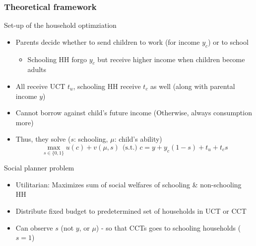 \documentclass[aspectratio=169]{beamer}
\begin{document}
\begin{frame}
\frametitle{Theoretical framework}
Set-up of the household optimziation
\begin{itemize}\setlength\itemsep{3pt}
\item Parents decide whether to send children to work (for income $y_c$) or to school
\begin{itemize}
\item Schooling HH forgo $y_c$ but receive higher income when children become adults
\end{itemize}
\item All receive UCT $t_u$, schooling HH receive $t_c$ as well (along with parental income $y$)
\item Cannot borrow against child's future income (Otherwise, always consumption more)
\item Thus, they solve ($s$: schooling, $\mu$: child's ability)
\[
\max_{s\in\{0,1\}} u(c) + v(\mu, s) \ \ \text{(s.t.) } c = y + y_c(1-s)+t_u + t_c s
\]
\end{itemize}\medskip
Social planner problem
\begin{itemize}\setlength\itemsep{3pt}
\item Utilitarian: Maximizes sum of social welfares of schooling \& non-schooling HH
\item Distribute fixed budget to predetermined set of households in UCT or CCT
\item Can observe $s$ (not $y$, or $\mu$) - so that CCTs goes to schooling households ($s=1$)
 \end{itemize}
\end{frame}
\end{document}
